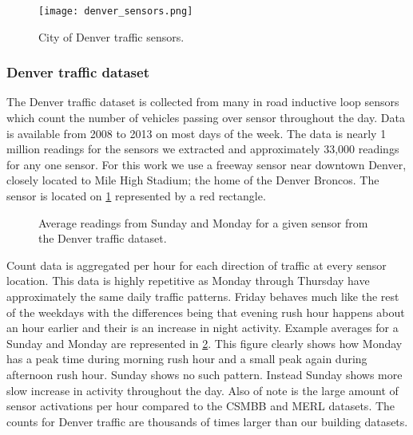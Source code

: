 \begin{figure}[!b]
	\begin{center}
		\texttt{[image: denver\_sensors.png]}
	\end{center}
	\caption{City of Denver traffic sensors.}
	\label{fig:denvertraffic}
\end{figure}

\subsubsection{Denver traffic dataset}
The Denver traffic dataset is collected from many in road inductive loop sensors which count the number of vehicles passing over sensor throughout the day.  Data is available from 2008 to 2013 on most days of the week.  The data is nearly 1 million readings for the sensors we extracted and approximately 33,000 readings for any one sensor.  For this work we use a freeway sensor near downtown Denver, closely located to Mile High Stadium; the home of the Denver Broncos.  The sensor is located on \ref{fig:denvertraffic} represented by a red rectangle.

\begin{figure}[t]
	\begin{center}
	\end{center}
	\caption{Average readings from Sunday and Monday for a given sensor from the Denver traffic dataset.}
	\label{fig:denver_day_raw}
\end{figure}

Count data is aggregated per hour for each direction of traffic at every sensor location.  This data is highly repetitive as Monday through Thursday have approximately the same daily traffic patterns.  Friday behaves much like the rest of the weekdays with the differences being that evening rush hour happens about an hour earlier and their is an increase in night activity.   Example averages for a Sunday and Monday are represented in \ref{fig:denver_day_raw}.  This figure clearly shows how Monday has a peak time during morning rush hour and a small peak again during afternoon rush hour.  Sunday shows no such pattern.  Instead Sunday shows more slow increase in activity throughout the day.  Also of note is the large amount of sensor activations per hour compared to the CSMBB and MERL datasets.  The counts for Denver traffic are thousands of times larger than our building datasets.

